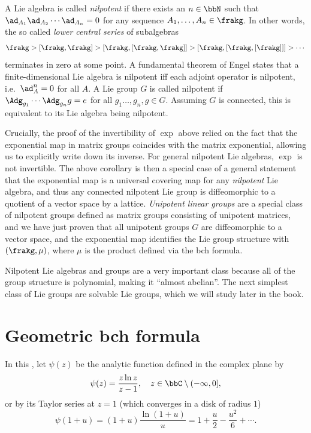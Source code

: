 \begin{rem}\label{rem nilpotent Lie alg}
    A Lie algebra is called \emph{nilpotent} if there exists an $n\in\bbN$ such that $\ad_{A_1}\ad_{A_2}\cdots \ad_{A_n}=0$ for any sequence $A_1,\ldots,A_n\in\frakg$. In other words, the so called \emph{lower central series} of subalgebras 
    \[\frakg>[\frakg,\frakg]>[\frakg,[\frakg,\frakg]]>[\frakg,[\frakg,[\frakg]]]>\cdots\]
    terminates in zero at some point. A fundamental theorem of Engel states that a finite-dimensional Lie algebra is nilpotent iff each adjoint operator is nilpotent, i.e.~$\ad_A^n=0$ for all $A$. A Lie group $G$ is called nilpotent if $\Adg_{g_1}\cdots \Adg_{g_n}g=e$ for all $g_1\ldots,g_n,g\in G$. Assuming $G$  is connected, this is equivalent to its Lie algebra being nilpotent. 
    
    Crucially, the proof of the invertibility of $\exp$ above relied on the fact that the exponential map in matrix groups coincides with the matrix exponential, allowing us to explicitly write down its inverse. For general nilpotent Lie algebras, $\exp$ is not invertible. The above corollary is then a special case of a general statement that the exponential map is a universal covering map for any \emph{nilpotent} Lie algebra, and thus any connected nilpotent Lie group is diffeomorphic to a quotient of a vector space by a lattice.  \emph{Unipotent linear groups} are a special class of nilpotent groups defined as matrix groups consisting of unipotent matrices, and we have just proven that all unipotent groups $G$ are diffeomorphic to a vector space, and the exponential map identifies the Lie group structure with $(\frakg,\mu)$, where $\mu$ is the product defined via the \gls{bch} formula.

    Nilpotent Lie algebras and groups are a very important class because all of the group structure is polynomial, making it ``almost abelian''. The next simplest class of Lie groups are solvable Lie groups, which we will study later in the book.
\end{rem}





\section{Geometric \texorpdfstring{\gls{bch}}{BCH} formula}

In this \sect, let $\psi(z)$ be the analytic function defined in the complex plane by
\[\psi(z)=\frac{z\ln z}{z-1},\quad z\in\bbC\setminus(-\infty,0],\]
or by its Taylor series at $z=1$ (which converges in a disk of radius $1$)
\[\psi(1+u)=(1+u)\frac{\ln (1+u)}{u}=1+\frac{u}{2}-\frac{u^2}{6}+\cdots .\]

